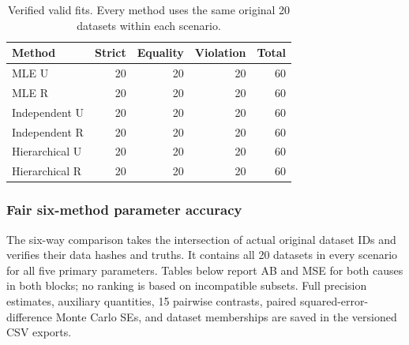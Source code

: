 \begin{table}[htbp]\centering\small

\caption{Verified valid fits. Every method uses the same original 20 datasets within each scenario.}\label{tab:sim-counts}

\begin{tabular}{lrrrr}\hline Method & Strict & Equality & Violation & Total\\\hline

MLE U & 20 & 20 & 20 & 60\\

MLE R & 20 & 20 & 20 & 60\\

Independent U & 20 & 20 & 20 & 60\\

Independent R & 20 & 20 & 20 & 60\\

Hierarchical U & 20 & 20 & 20 & 60\\

Hierarchical R & 20 & 20 & 20 & 60\\

\hline\end{tabular}\end{table}

\subsubsection*{Fair six-method parameter accuracy}

The six-way comparison takes the intersection of actual original dataset IDs and verifies their data hashes and truths. It contains all 20 datasets in every scenario for all five primary parameters. Tables below report AB and MSE for both causes in both blocks; no ranking is based on incompatible subsets. Full precision estimates, auxiliary quantities, 15 pairwise contrasts, paired squared-error-difference Monte Carlo SEs, and dataset memberships are saved in the versioned CSV exports.


